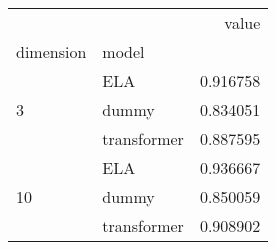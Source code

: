 \begin{tabular}{llr}
\toprule
 &  & value \\
dimension & model &  \\
\midrule
\multirow[t]{3}{*}{3} & ELA & 0.916758 \\
 & dummy & 0.834051 \\
 & transformer & 0.887595 \\
\cline{1-3}
\multirow[t]{3}{*}{10} & ELA & 0.936667 \\
 & dummy & 0.850059 \\
 & transformer & 0.908902 \\
\cline{1-3}
\bottomrule
\end{tabular}
